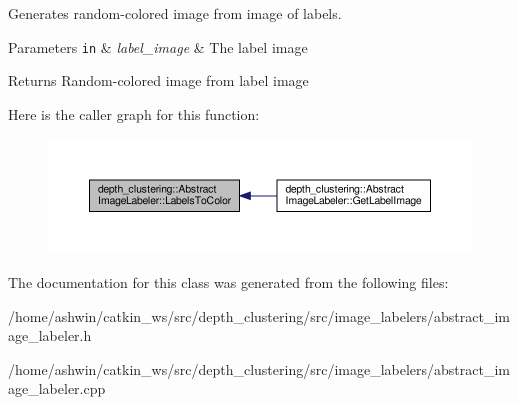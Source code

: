 Generates random-\/colored image from image of labels. 


\begin{DoxyParams}[1]{Parameters}
\mbox{\tt in}  & {\em label\+\_\+image} & The label image\\
\hline
\end{DoxyParams}
\begin{DoxyReturn}{Returns}
Random-\/colored image from label image 
\end{DoxyReturn}
Here is the caller graph for this function\+:\nopagebreak
\begin{figure}[H]
\begin{center}
\leavevmode
\includegraphics[width=350pt]{classdepth__clustering_1_1AbstractImageLabeler_abab18e0c1ca40b54922a2f21948b996b_icgraph}
\end{center}
\end{figure}


The documentation for this class was generated from the following files\+:\begin{DoxyCompactItemize}
\item 
/home/ashwin/catkin\+\_\+ws/src/depth\+\_\+clustering/src/image\+\_\+labelers/abstract\+\_\+image\+\_\+labeler.\+h\item 
/home/ashwin/catkin\+\_\+ws/src/depth\+\_\+clustering/src/image\+\_\+labelers/abstract\+\_\+image\+\_\+labeler.\+cpp\end{DoxyCompactItemize}
